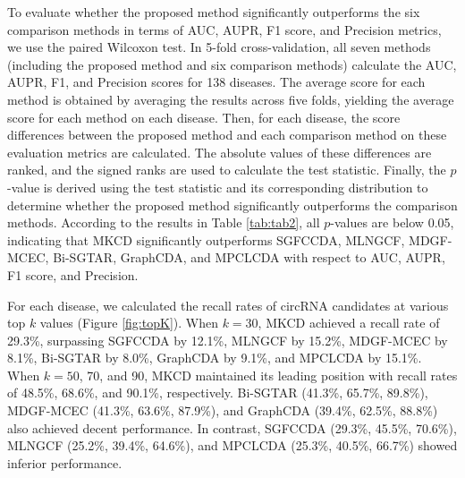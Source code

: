 \documentclass[journal,twoside,web]{ieeecolor}
\begin{document}
To evaluate whether the proposed method significantly outperforms the six comparison methods in terms of AUC, AUPR, F1 score, and Precision metrics, we use the paired Wilcoxon test. In 5-fold cross-validation, all seven methods (including the proposed method and six comparison methods) calculate the AUC, AUPR, F1, and Precision scores for 138 diseases. The average score for each method is obtained by averaging the results across five folds, yielding the average score for each method on each disease. Then, for each disease, the score differences between the proposed method and each comparison method on these evaluation metrics are calculated. The absolute values of these differences are ranked, and the signed ranks are used to calculate the test statistic. Finally, the $p$-value is derived using the test statistic and its corresponding distribution to determine whether the proposed method significantly outperforms the comparison methods. According to the results in Table \ref{tab:tab2}, all $p$-values are below 0.05, indicating that MKCD significantly outperforms SGFCCDA, MLNGCF, MDGF-MCEC, Bi-SGTAR, GraphCDA, and MPCLCDA with respect to AUC, AUPR, F1 score, and Precision.%

For each disease, we calculated the recall rates of circRNA candidates at various top $k$ values (Figure \ref{fig:topK}). When $k = 30$, MKCD achieved a recall rate of 29.3\%, surpassing SGFCCDA by 12.1\%, MLNGCF by 15.2\%, MDGF-MCEC by 8.1\%, Bi-SGTAR by 8.0\%, GraphCDA by 9.1\%, and MPCLCDA by 15.1\%. When $k = 50$, 70, and 90, MKCD maintained its leading position with recall rates of 48.5\%, 68.6\%, and 90.1\%, respectively. Bi-SGTAR (41.3\%, 65.7\%, 89.8\%), MDGF-MCEC (41.3\%, 63.6\%, 87.9\%), and GraphCDA (39.4\%, 62.5\%, 88.8\%) also achieved decent performance. In contrast, SGFCCDA (29.3\%, 45.5\%, 70.6\%), MLNGCF (25.2\%, 39.4\%, 64.6\%), and MPCLCDA (25.3\%, 40.5\%, 66.7\%) showed inferior performance.
\end{document}
